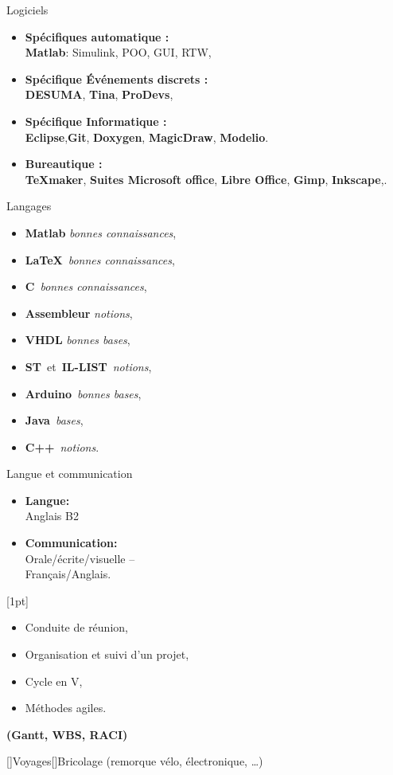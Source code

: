 \documentclass[11pt,a4paper,sans]{moderncv}        %
\newcommand{\myitem}{\textbullet}
\begin{document}
\vspace{4mm}

\tripleitemiseavecTitre%
{Logiciels}%
{{%
	\begin{itemize}[label=\myitem]
		\item \textbf{Spécifiques automatique :}\\ \textbf{Matlab}: Simulink, POO, GUI, RTW, 
		\item \textbf{Spécifique Événements discrets :}\\ \textbf{DESUMA}, \textbf{Tina}, \textbf{ProDevs}, 
		\item \textbf{Spécifique Informatique :}\\ \textbf{Eclipse},\textbf{Git}, \textbf{Doxygen}, \textbf{MagicDraw}, \textbf{Modelio}.
		\item \textbf{Bureautique :} \\\textbf{\TeX maker}, \textbf{Suites Microsoft office}, \textbf{Libre Office}, \textbf{Gimp}, \textbf{Inkscape},.
	\end{itemize}
}}%
{Langages}%
{%
	\begin{itemize}[label=\myitem]
		\item \textbf{Matlab} \textit{bonnes connaissances}, 
		\item \textbf{\LaTeX}~\textit{bonnes connaissances}, 
		\item \textbf{C}~\textit{bonnes connaissances},
		\item \textbf{Assembleur} \textit{notions}, 
		\item \textbf{VHDL} \textit{bonnes bases}, 
		\item \textbf{ST}~et~\textbf{IL-LIST}~\textit{notions}, 
		\item \textbf{Arduino}~\textit{bonnes bases}, 
		\item \textbf{Java}~\textit{bases}, 
		\item \textbf{C++}~\textit{notions}.%
	\end{itemize}
}%
{Langue et communication}%
{{%
	\begin{itemize}[label=\myitem]%
	\item \textbf{Langue: } \\ Anglais B2%
	\item \textbf{Communication: } \\ Orale/écrite/visuelle -- \\Français/Anglais. %
	\end{itemize}%
	\vspace{2mm}
	\noindent{}[1pt]\vspace{0mm}
\begin{itemize}[label=\myitem]%
\item Conduite de réunion,
\item Organisation et suivi d'un projet,
\item Cycle en V,
\item Méthodes agiles.
\end{itemize}
	\textbf{(Gantt, WBS, RACI)}%
}}
\vspace{4mm}
\vspace{2mm}

[\bcfleur]{Voyages}[\bcvelo]{Bricolage (remorque vélo, électronique, …)}
%
\end{document}
